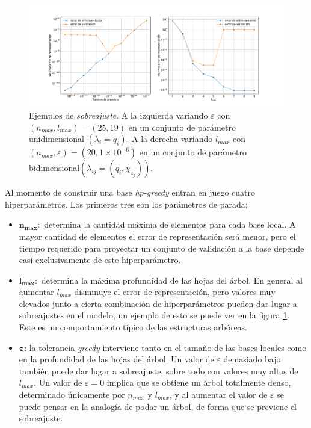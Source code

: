 \begin{figure}[h!]
\centering
\includegraphics[width=1\columnwidth ,trim={2cm, 1cm, 1cm, 1.2cm}]{figs/overfit.pdf}
\caption{Ejemplos de \textit{sobreajuste}. A la izquierda variando $\varepsilon$ con $(n_{max}, l_{max}) = (25, 19)$ en un conjunto de parámetro unidimensional $(\lambda_i = q_i)$. A la derecha variando $l_{max}$ con $(n_{max}, \varepsilon) = (20, 1\times10^{-6})$ en un conjunto de parámetro bidimensional$(\lambda_{ij} = (q_i, \chi_{z_j})) $.}
\label{fig:overfit}
\end{figure}

Al momento de construir una base \textit{hp-greedy} entran en juego cuatro hiperparámetros. Los primeros tres son los parámetros de parada;
\begin{itemize}
\item $\bm{n_{max}}:$ determina la cantidad máxima de elementos para cada base local. A mayor cantidad de elementos el error de representación será menor, pero el tiempo requerido para proyectar un conjunto de validación a la base depende casi exclusivamente de este hiperparámetro.
\item $\bm{l_{max}}:$ determina la máxima profundidad de las hojas del árbol. En general al aumentar $l_{max}$ disminuye el error de representación, pero valores muy elevados junto a cierta combinación de hiperparámetros pueden dar lugar a sobreajustes en el modelo, un ejemplo de esto se puede ver en la figura \ref{fig:overfit}. Este es un comportamiento típico de las estructuras arbóreas.
\item $\bm{\varepsilon}$: la tolerancia \textit{greedy} interviene tanto en el tamaño de las bases locales como en la profundidad de las hojas del árbol. Un valor de $\varepsilon$ demasiado bajo también puede dar lugar a sobreajuste, sobre todo con valores muy altos de $l_{max}$. Un valor de $\varepsilon = 0$ implica que se obtiene un árbol totalmente denso, determinado únicamente por $n_{max}$ y $l_{max}$, y al aumentar el valor de $\varepsilon$ se puede pensar en la analogía de podar un árbol, de forma que se previene el sobreajuste.
\end{itemize}

